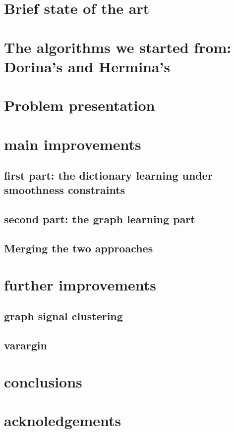 \documentclass[11pt,a4paper,titlepage]{article}
\begin{document}
\section{Brief state of the art}
\lipsum[1-15]

\section{The algorithms we started from: Dorina's and Hermina's}
\lipsum[1-15]

\section{Problem presentation}
\lipsum[1-15]

\section{main improvements}
\lipsum[1-15]

\subsection{first part: the dictionary learning under smoothness constraints}
\lipsum[1-15]

\subsection{second part: the graph learning part}
\lipsum[1-15]

\subsection{Merging the two approaches}
\lipsum[1-15]

\section{further improvements}
\lipsum[1-15]

\subsection{graph signal clustering}
\lipsum[1-15]

\subsection{varargin}
\lipsum[1-15]

\section{conclusions}
\lipsum[1-15]

\section{acknoledgements}
\lipsum[1-15]
\end{document}
